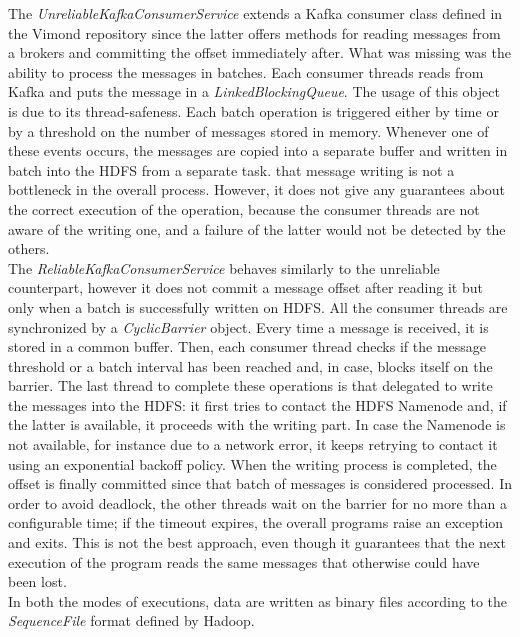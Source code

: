The \textit{UnreliableKafkaConsumerService} extends a Kafka consumer class defined in the Vimond repository since the latter offers methods for reading messages from a brokers and committing the offset immediately after. What was missing was the ability to process the messages in batches. Each consumer threads reads from Kafka and puts the message in a \textit{LinkedBlockingQueue}. The usage of this object is due to its thread-safeness. Each batch operation is triggered either by time or by a threshold on the number of messages stored in memory. Whenever one of these events occurs, the messages are copied into a separate buffer and written in batch into the HDFS from a separate task. that message writing is not a bottleneck in the overall process. However, it does not give any guarantees about the correct execution of the operation, because the consumer threads are not aware of the writing one, and a failure of the latter would not be detected by the others.\\
The \textit{ReliableKafkaConsumerService} behaves similarly to the unreliable counterpart, however it does not commit a message offset after reading it but only when a batch is successfully written on HDFS. All the consumer threads are synchronized by a \textit{CyclicBarrier} object. Every time a message is received, it is stored in a common buffer. Then, each consumer thread checks if the message threshold or a batch interval has been reached and, in case, blocks itself on the barrier. The last thread to complete these operations is that delegated to write the messages into the HDFS: it first tries to contact the HDFS Namenode and, if the latter is available, it proceeds with the writing part. In case the Namenode is not available, for instance due to a network error, it keeps retrying to contact it using an exponential backoff policy. When the writing process is completed, the offset is finally committed since that batch of messages is considered processed. In order to avoid deadlock, the other threads wait on the barrier for no more than a configurable time; if the timeout expires, the overall programs raise an exception and exits. This is not the best approach, even though it guarantees that the next execution of the program reads the same messages that otherwise could have been lost. \\
In both the modes of executions, data are written as binary files according to the \textit{SequenceFile} format defined by Hadoop.

